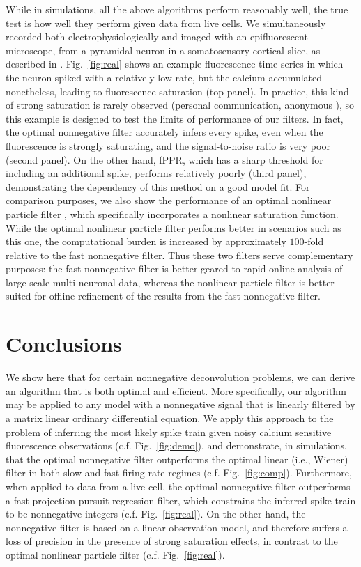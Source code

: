 \documentclass[12pt]{article}
\begin{document}
While in simulations, all the above algorithms perform reasonably well, the true test is how well they perform given data from live cells. We simultaneously recorded both electrophysiologically and imaged with an epifluorescent microscope, from a pyramidal neuron in a somatosensory cortical slice, as described in \cite{MacLeanYuste05}. Fig.\ \ref{fig:real} shows an example fluorescence time-series in which the neuron spiked with a relatively low rate, but the calcium accumulated nonetheless, leading to fluorescence saturation (top panel). In practice, this kind of strong saturation is rarely observed (personal communication, anonymous%
), so this example is designed to test the limits of performance of our filters. %
In fact, the optimal nonnegative filter accurately infers every spike, even when the fluorescence is strongly saturating, and the signal-to-noise ratio is very poor (second panel). On the other hand, fPPR, which has a sharp threshold for including an additional spike, performs relatively poorly (third panel), demonstrating the dependency of this method on a good model fit.  For comparison purposes, we also show the performance of an optimal nonlinear particle filter \cite{BJ08}, which specifically incorporates a nonlinear saturation function. While the optimal nonlinear particle filter performs better in scenarios such as this one, the computational burden is increased by approximately $100$-fold relative to the fast nonnegative filter. Thus these two filters serve complementary purposes: the fast nonnegative filter is better geared to rapid online analysis of large-scale multi-neuronal data, whereas the nonlinear particle filter is better suited for offline refinement of the results from the fast nonnegative filter.   

\section{Conclusions} \label{sec:dis}

We show here that for certain nonnegative deconvolution problems, we can derive an algorithm that is both optimal and efficient.  More specifically, our algorithm may be applied to any model with a nonnegative signal that is linearly filtered by a matrix linear ordinary differential equation.  We apply this approach to the problem of inferring the most likely spike train given noisy calcium sensitive fluorescence observations (c.f. Fig.\ \ref{fig:demo}), and demonstrate, in simulations, that the optimal nonnegative filter outperforms the optimal linear (i.e., Wiener) filter in both slow and fast firing rate regimes (c.f. Fig.\ \ref{fig:comp}).  Furthermore, when applied to data from a live cell, the optimal nonnegative filter outperforms a fast projection pursuit regression filter, which constrains the inferred spike train to be nonnegative integers (c.f. Fig.\ \ref{fig:real}). On the other hand, the nonnegative filter is based on a linear observation model, and therefore suffers a loss of precision in the presence of strong saturation effects, in contrast to the optimal nonlinear particle filter (c.f. Fig.\ \ref{fig:real}).    
\end{document}
